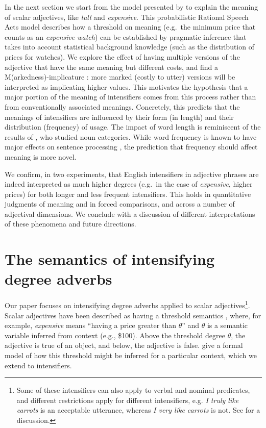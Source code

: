 \documentclass[10pt,letterpaper]{article}
\newcommand{\w}[1]{\emph{#1}}
\begin{document}
In the next section we start from the model presented by  to explain the meaning of scalar adjectives, like \emph{tall} and \emph{expensive}. This probabilistic Rational Speech Acts \cite{frank,goodman} model describes how a threshold on meaning (e.g.~the minimum price that counts as an \emph{expensive watch}) can be established by pragmatic inference that takes into account statistical background knowledge (such as the distribution of prices for watches). We explore the effect of having multiple versions of the adjective that have the same meaning but different costs, and find a M(arkedness)-implicature \cite{levinson}: more marked (costly to utter) versions will be interpreted as implicating higher values.
This motivates the hypothesis that a major portion of the meaning of intensifiers comes from this process rather than from conventionally associated meanings. Concretely, this predicts that the meanings of intensifiers are influenced by their form (in length) and their distribution (frequency) of usage. The impact of word length is reminiscent of the results of , who studied noun categories. While word frequency is known to have major effects on sentence processing \cite[e.g.]{levy}, the prediction that frequency should affect meaning is more novel.

We confirm, in two experiments, that English intensifiers in adjective phrases are indeed interpreted as much higher degrees (e.g.~in the case of \w{expensive}, higher prices) for both longer and less frequent intensifiers. This holds in quantitative judgments of meaning and in forced comparisons, and across a number of adjectival dimensions. We conclude with a discussion of different interpretations of these phenomena and future directions.

\section{The semantics of intensifying degree adverbs}

Our paper focuses on intensifying degree adverbs applied to scalar adjectives\footnote{Some of these intensifiers can also apply to verbal and nominal predicates, and different restrictions apply for different intensifiers, e.g. \w{I truly like carrots} is an acceptable utterance, whereas \w{I very like carrots} is not. See  for a discussion.}. Scalar adjectives have been described as having a threshold semantics \cite{kennedy}, where, for example, \w{expensive} means ``having a price greater than $\theta$'' and $\theta$ is a semantic variable inferred from context (e.g., \$100). Above the threshold degree $\theta$, the adjective is true of an object, and below, the adjective is false.
 give a formal model of how this threshold might be inferred for a particular context, which we extend to intensifiers.
\end{document}
